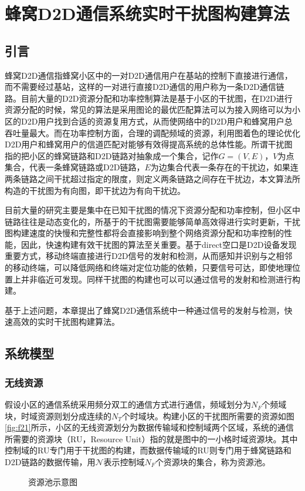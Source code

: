 \documentclass[figurelist,tablelist,algorithmlist,nomlist,masters]{seuthesix}
\begin{document}
	\chapter{蜂窝D2D通信系统实时干扰图构建算法}
	\section{引言}
	蜂窝D2D通信指蜂窝小区中的一对D2D通信用户在基站的控制下直接进行通信，而不需要经过基站，这样的一对进行直接D2D通信的用户称为一条D2D通信链路。目前大量的D2D资源分配和功率控制算法是基于小区的干扰图，在D2D进行资源分配的时候，常见的算法是采用图论的最优匹配算法可以为接入网络可以为小区的D2D用户找到合适的资源复用方式，从而使网络中的D2D用户和蜂窝用户总吞吐量最大。而在功率控制方面，合理的调配频域的资源，利用图着色的理论优化D2D用户和蜂窝用户的信道匹配对能够有效得提高系统的总体性能。所谓干扰图指的把小区的蜂窝链路和D2D链路对抽象成一个集合，记作$G=(V,E)$，$V$为点集合，代表一条蜂窝链路或D2D链路，$E$为边集合代表一条存在的干扰边，如果连两条链路之间干扰超过指定的限度，则定义两条链路之间存在干扰边，本文算法所构造的干扰图为有向图，即干扰边为有向干扰边。

	目前大量的研究主要是集中在已知干扰图的情况下资源分配和功率控制，但小区中链路往往是动态变化的，所基于的干扰图需要能够简单高效得进行实时更新，干扰图构建速度的快慢和完整性都将会直接影响到整个网络资源分配和功率控制的性能，因此，快速构建有效干扰图的算法至关重要。基于direct空口是D2D设备发现重要方式，移动终端直接进行D2D信号的发射和检测，从而感知并识别与之相邻的移动终端，可以降低网络和终端对定位功能的依赖，只要信号可达，即使地理位置上并非临近可发现。同样干扰图的构建也可以可以通过信号的发射和检测进行构建。

	基于上述问题，本章提出了蜂窝D2D通信系统中一种通过信号的发射与检测，快速高效的实时干扰图构建算法。

	\section{系统模型}
	\subsection{无线资源}
	假设小区的通信系统采用频分双工的通信方式进行通信，频域划分为$N_{F}$个频域块，时域资源则划分成连续的$N_{T}$个时域块。构建小区的干扰图所需要的资源如图\ref{fig:f21}所示，小区的无线资源划分为数据传输域和控制域两个区域，系统的通信所需要的资源块（RU，Resource Unit）指的就是图中的一小格时域资源块。其中控制域的RU专门用于干扰图的构建，而数据传输域的RU则专门用于蜂窝链路和D2D链路的数据传输，用$\mathcal{N}$表示控制域$N_{F}$个资源块的集合，称为资源池。
	\begin{figure}[htb]
		\centering
		\caption{资源池示意图}\label{f21}
	\end{figure}
\end{document}

